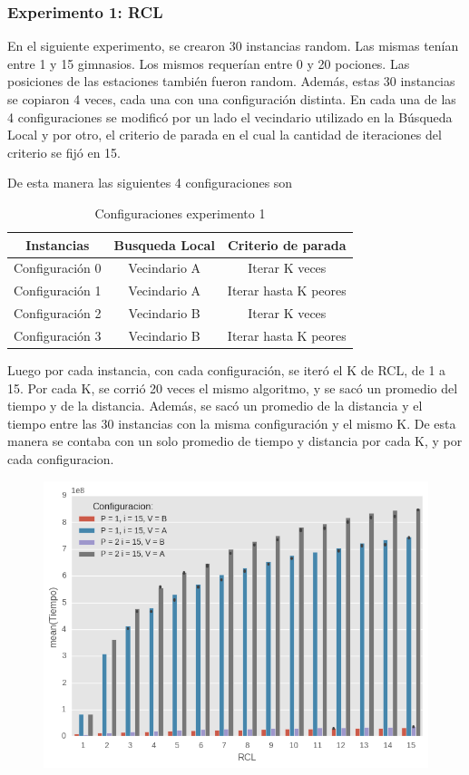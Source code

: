 \subsubsection{Experimento 1: RCL}

En el siguiente experimento, se crearon 30 instancias random. Las mismas tenían entre 1 y 15 gimnasios. Los mismos requerían entre 0 y 20 pociones. Las posiciones de las estaciones también fueron random. Además, estas 30 instancias se copiaron 4 veces, cada una con una configuración distinta. En cada una de las 4 configuraciones se modificó por un lado el vecindario utilizado en la Búsqueda Local y por otro, el criterio de parada en el cual la cantidad de iteraciones del criterio se fijó en 15.

De esta manera las siguientes 4 configuraciones son 

\begin{table}[H]
\centering
\begin{tabular}{ |c|c|c| } 
 \hline
 Instancias&Busqueda Local&Criterio de parada\\ 
 \hline
 Configuración 0 & Vecindario A & Iterar K veces\\
 \hline
 Configuración 1 & Vecindario A & Iterar hasta K peores\\
 \hline
 Configuración 2 & Vecindario B & Iterar K veces \\
 \hline
 Configuración 3 & Vecindario B & Iterar hasta K peores\\
 \hline
\end{tabular}
\caption{Configuraciones experimento 1}
\end{table}


Luego por cada instancia, con cada configuración, se iteró el K de RCL, de 1 a 15. Por cada K, se corrió 20 veces el mismo algoritmo, y se sacó un promedio del tiempo y de la distancia.
Además, se sacó un promedio de la distancia y el tiempo entre las 30 instancias con la misma configuración y el mismo K. De esta manera se contaba con un solo promedio de tiempo y distancia por cada K, y por cada configuracion.

  \begin{figure}[H]
      \begin{center}
        \includegraphics[width=0.7\columnwidth]{imagenes/Ej4/ej4_exp1_Tiempo.png}
      \end{center}
  \end{figure}


